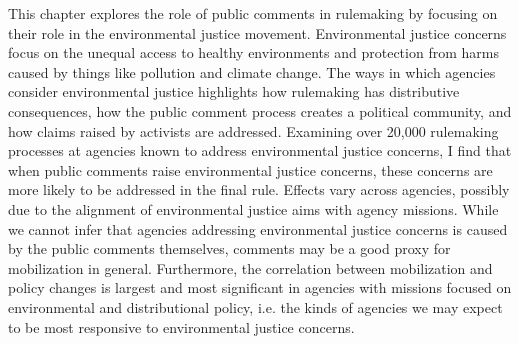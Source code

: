 This chapter explores the role of public comments in rulemaking by focusing on their role in the environmental justice movement. Environmental justice concerns focus on the unequal access to healthy environments and protection from harms caused by things like pollution and climate change. The ways in which agencies consider environmental justice highlights how rulemaking has distributive consequences, how the public comment process creates a political community, and how claims raised by activists are addressed. Examining over 20,000 rulemaking processes at agencies known to address environmental justice concerns, I find that when public comments raise environmental justice concerns, these concerns are more likely to be addressed in the final rule. Effects vary across agencies, possibly due to the alignment of environmental justice aims with agency missions. While we cannot infer that agencies addressing environmental justice concerns is caused by the public comments themselves, comments may be a good proxy for mobilization in general. Furthermore, the correlation between mobilization and policy changes is largest and most significant in agencies with missions focused on environmental and distributional policy, i.e. the kinds of agencies we may expect to be most responsive to environmental justice concerns.